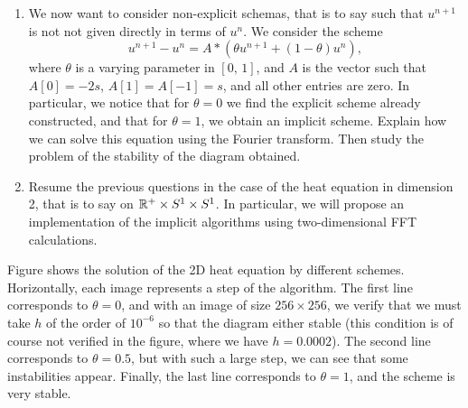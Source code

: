 \begin{exo}
\begin{enumerate}
\item {}   We now want to consider non-explicit schemas, that is to say such that $ u^{n + 1} $ is not not given directly in terms of $ u^{n} $. We consider the scheme
\begin{equation*}
u^{n + 1} - u^{n} = A * \left(\theta u^{n + 1} + (1- \theta) u^{n} \right),
\end{equation*}
where $ \theta $ is a varying parameter in $ [0, \, 1] $, and $ A $ is the vector such that $ A [0] = - 2s $, $ A [1] = A [-1] = s $, and all other entries are zero. In particular, we notice that for $ \theta = 0 $ we find the explicit scheme already constructed, and that for $ \theta = 1 $, we obtain an implicit scheme. Explain how we can solve this equation using the Fourier transform. Then study the problem of the stability of the diagram obtained.
\item Resume the previous questions in the case of the heat equation in dimension 2, that is to say on $ \mathbb{R}^+ \times S^1 \times S^1 $. In particular, we will propose an implementation of the implicit algorithms using two-dimensional FFT calculations.
\end{enumerate}  Figure  shows the solution of the 2D heat equation by different schemes. Horizontally, each image represents a step of the algorithm. The first line corresponds to $ \theta = 0 $, and with an image of size $ 256 \times 256 $, we verify that we must take $ h $ of the order of $ 10^{- 6} $ so that the diagram either stable (this condition is of course not verified in the figure, where we have $ h = 0.0002 $). The second line corresponds to $ \theta = 0.5 $, but with such a large step, we can see that some instabilities appear. Finally, the last line corresponds to $ \theta = 1 $, and the scheme is very stable. 


\end{exo}

